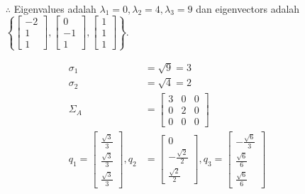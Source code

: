 \documentclass[12pt, a4paper]{scrartcl}
\begin{document}
\begin{enumerate}
\begin{enumerate}
\begin{align*}
                \end{align*}
                \begin{itemize}
                    \item[$\therefore$] Eigenvalues adalah $\lambda_1=0,\lambda_2=4,\lambda_3=9$ dan eigenvectors adalah $\left\{\begin{bmatrix}
                        -2\\1\\1
                    \end{bmatrix},\begin{bmatrix}
                        0\\-1\\1
                    \end{bmatrix},\begin{bmatrix}
                        1\\1\\1
                    \end{bmatrix}\right\}$.
                \end{itemize}
                \begin{align*}
                    \sigma_1&=\sqrt{9}=3
                    \\ \sigma_2&=\sqrt{4}=2
                    \\ \Sigma_A&=\begin{bmatrix}
                        3&0&0\\0&2&0\\0&0&0
                    \end{bmatrix}
                    \\ q_1 = \begin{bmatrix}
                        \frac{\sqrt{3}}{3}\\\frac{\sqrt{3}}{3}\\\frac{\sqrt{3}}{3}
                    \end{bmatrix}
                    , q_2 &= \begin{bmatrix}
                        0\\-\frac{\sqrt{2}}{2}\\\frac{\sqrt{2}}{2}
                    \end{bmatrix}
                    , q_3 = \begin{bmatrix}
                        -\frac{\sqrt{6}}{3}\\\frac{\sqrt{6}}{6}\\\frac{\sqrt{6}}{6}
                    \end{bmatrix}

\end{align*}
\end{enumerate}
\end{enumerate}
\end{document}
